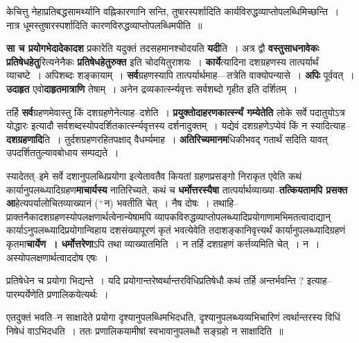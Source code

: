 \documentclass[article,12pt,a4paper]{memoir}
\newcommand{\add}[1]{($^{+}$#1)}
\begin{document}
	  \endgroup
	

	  \pstart केचित्तु नेहाप्रतिबद्धसामर्थ्यानि वह्निकारणानि सन्ति, तुषारस्पर्शादिति कार्यविरुद्धव्याप्तोपलब्धिमिच्छन्ति । नात्र धूमस्तुषारस्पर्शादिति कारणविरुद्धव्याप्तोपलब्धिमपीति ॥
	\pend
      

	  \pstart \textbf{सा च प्रयोगभेदादेकादश} प्रकारेति यदुक्तं तदसहमानश्चोदयति \textbf{यदी}ति । अत्र द्वौ \textbf{वस्तुसाधनावेकः प्रतिषेधहेतु}रित्यनेनैकः \textbf{प्रतिषेधहेतुरुक्त} इति चोदयितुराशयः । \textbf{कार्ये}त्यादिना दशग्रहणस्य तात्पर्यार्थं व्याचष्टे । अपिशब्दः शङ्कायाम् । \textbf{सर्व}ग्रहणस्यापि तात्पर्यार्थमाह—तत्रेति वाक्योपन्यासे । \textbf{अपिः} पूर्ववत् । \textbf{उदाहृत} एवो\textbf{दाहृतमात्राणि} तेषाम् । अनेन द्रव्यकार्त्स्न्यवृत्तः सर्वशब्दो गृहीत इति दर्शितम् ।
	\pend
      

	  \pstart तर्हि \leavevmode{} \textbf{सर्व}ग्रहणमेवास्तु किं दशग्रहणेनेत्याह--दशेति । \textbf{प्रयुक्तोदाहरणकार्त्स्न्यं गम्येतेति} लोके सर्वे पदातुयोऽत्र योद्धारः इत्यादौ सर्वशब्दस्योपदर्शितकार्त्स्न्यवृत्तस्य दर्शनादुक्तम् । यद्येवं दशग्रहणेऽप्येवं किं न स्यादित्याह--\textbf{दशग्रहणादि}ति । तुर्दशग्रहणरहितपक्षाद् वैधर्म्यमाह । \textbf{अतिरिच्यमानम}धिकीभवद् गतार्थं सदिति यावत् उपदर्शिततुल्यावबोधाय सम्पद्यते ।
	\pend
      

	  \pstart स्यादेतत्--इमे सर्वे दशानुपलब्धिप्रयोगा इत्येतावतैव कियतां ग्रहणप्रसङ्गो निराकृत एवेति कथं कार्यानुपलब्ध्यादिग्रहण\textbf{माचार्यस्य} नातिरिच्यते, कथं च \textbf{धर्मोत्तरस्यैषा} तात्पर्यार्थव्याख्या--\textbf{तत्कियतामपि प्रसक्त आ}हेत्यपर्यालोचितव्याख्यानं \add{न} भवतीति चेत् । नैष दोषः । तथाहि--प्राक्तनैकादशग्रहणस्योपलक्षणार्थत्वेनान्येषामपि व्यापकविरुद्धव्याप्तोपलब्ध्यादिप्रयोगाणामभिमतत्वादाद्यान् कार्याऽनुपलब्ध्यादिप्रयोगान्विहाय दशसंख्यापूरणं कृतं भवत्येवेति तदाशङ्कानिवृत्त्यर्थं कार्यानुपलब्ध्यादिग्रहणं कृतमा\textbf{चार्येण । धर्मोत्तरेणा}ऽपि तथा व्याख्यातमिति । न तर्हि दशग्रहणं कर्त्तव्यमिति चेत् । न । अस्योपलक्षणार्थत्वाददोष एषः ।  \leavevmode{} 
	  
	प्रतिषेधेन च प्रयोगा भिद्यन्ते । यदि प्रयोगान्तरेष्वर्थान्तरविधिप्रतिषेधौ कथं तर्हि अन्तर्भवन्ति ? इत्याह--पारम्पर्येणेति प्रणालिकयेत्यर्थः ।  
	  
	एतदुक्तं भवति--न साक्षादेते प्रयोगा दृश्यानुपलब्धिमभिदधति, दृश्यानुपलब्ध्यव्यभिचारिणं त्वर्थान्तरस्य विधिं निषेधं वाऽभिदधति । ततः प्रणालिकयामीषां स्वभावानुपलब्धौ सङ्ग्रहो न साक्षादिति ॥  
	  
\end{document}
